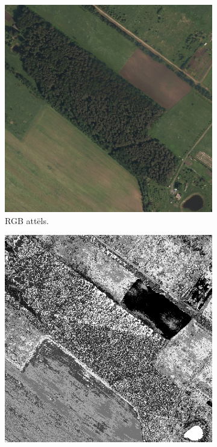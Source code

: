 \documentclass[12pt,paper=a4]{report}
\begin{document}
\begin{figure}[h!]
\centering
\begin{subfigure}[b]{.3\linewidth}
\includegraphics[width=\linewidth]{testImagepart}
\caption{RGB attēls.}
\end{subfigure}
\begin{subfigure}[b]{.3\linewidth}
\includegraphics[width=\linewidth]{map10part}

\end{subfigure}
\end{figure}
\end{document}
